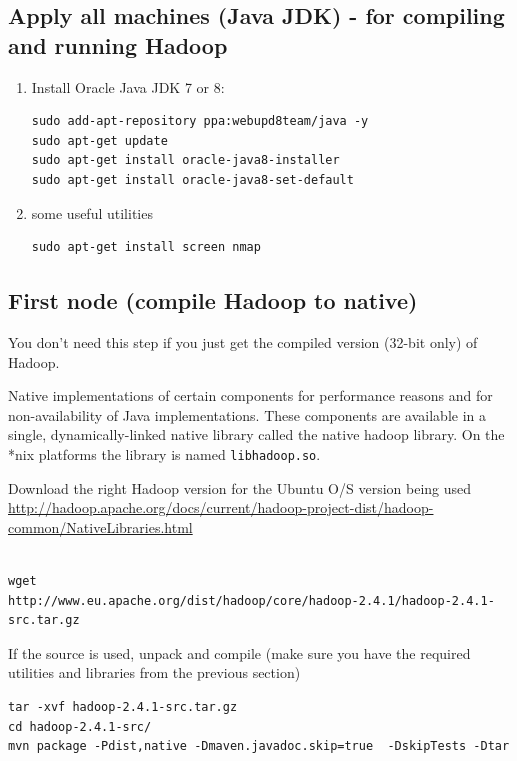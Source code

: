 \subsection{Apply all machines (Java JDK) - for compiling and running Hadoop}
\label{sec:configure_Java}

\begin{enumerate}
  \item Install Oracle Java JDK 7 or 8:
\begin{verbatim}
sudo add-apt-repository ppa:webupd8team/java -y
sudo apt-get update
sudo apt-get install oracle-java8-installer
sudo apt-get install oracle-java8-set-default
\end{verbatim}  
  
  \item some useful utilities
\begin{verbatim}
sudo apt-get install screen nmap
\end{verbatim}  
  
\end{enumerate}
\subsection{First node (compile Hadoop to native)}

You don't need this step if you just get the compiled version (32-bit only) of
Hadoop. 

Native implementations of certain components for performance reasons
and for non-availability of Java implementations.
These components are available in a single, dynamically-linked native library
called the native hadoop library. On the *nix platforms the library is named
\verb!libhadoop.so!. 

Download the right Hadoop version for the Ubuntu O/S version being used
\url{http://hadoop.apache.org/docs/current/hadoop-project-dist/hadoop-common/NativeLibraries.html}
\begin{verbatim}

wget
http://www.eu.apache.org/dist/hadoop/core/hadoop-2.4.1/hadoop-2.4.1-src.tar.gz

\end{verbatim}

If the source is used, unpack and compile (make sure you have the required
utilities and libraries from the previous section)
\begin{verbatim}
tar -xvf hadoop-2.4.1-src.tar.gz
cd hadoop-2.4.1-src/
mvn package -Pdist,native -Dmaven.javadoc.skip=true  -DskipTests -Dtar
\end{verbatim}

